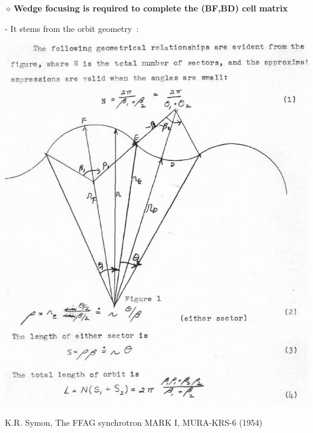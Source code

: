 \documentclass[12pt]{article}
\newcommand{\nid}{\noindent \ensuremath{\diamond~}}
\begin{document}
{}







\clearpage 



{\LARGE \bf \nid Wedge focusing is required to complete the (BF,BD) cell matrix}


{\Large - It stems from the orbit geometry~:}


\begin{center}
\includegraphics*[width=0.5\linewidth]{./figs_FFAG_introSlides/mura043_wedgeFoc.eps}

K.R. Symon, The FFAG synchrotron MARK I, MURA-KRS-6 (1954) 
\end{center}



\clearpage 
\end{document}
